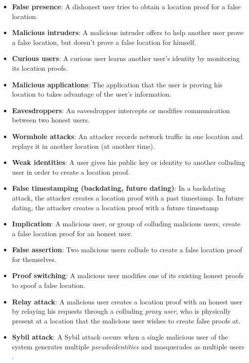 \begin{itemize}
	\item[] \textbf{False presence}: A dishonest user tries to obtain a location proof for a false location.
	\item[] \textbf{Malicious intruders}: A malicious intruder offers to help another user prove a false location, but doesn't prove a false location for himself.
	\item[] \textbf{Curious users}: A curious user learns another user's identity by monitoring its location proofs.
	\item[] \textbf{Malicious applications}: The application that the user is proving his location to takes advantage of the user's information.
	\item[] \textbf{Eavesdroppers}: An eavesdropper intercepts or modifies communication between two honest users.
	\item[] \textbf{Wormhole attacks}: An attacker records network traffic in one location and replays it in another location (at another time).
	\item[] \textbf{Weak identities}: A user gives his public key or identity to another colluding user in order to create a location proof.
	\item[] \textbf{False timestamping (backdating, future dating)}: In a backdating attack, the attacker creates a location proof with a past timestamp. In future dating, the attacker creates a location proof with a future timestamp
	\item[] \textbf{Implication}: A malicious user, or group of colluding malicious users, create a false location proof for an honest user.
	\item[] \textbf{False assertion}: Two malicious users collude to create a false location proof for themselves.
	\item[] \textbf{Proof switching}: A malicious user modifies one of its existing honest proofs to spoof a false location.
	\item[] \textbf{Relay attack}: A malicious user creates a location proof with an honest user by relaying his requests through a colluding \textit{proxy user}, who is physically present at a location that the malicious user wishes to create false proofs at.
	\item[] \textbf{Sybil attack}: A Sybil attack occurs when a single malicious user of the system generates multiple \textit{pseudoidentities} and masquerades as multiple users \cite{sybil}.
\end{itemize}